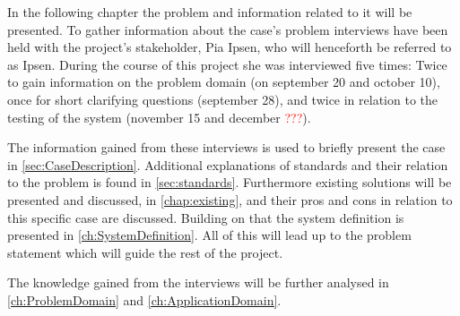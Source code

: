 In the following chapter the problem and information related to it will be presented.
To gather information about the case's problem interviews have been held with the project's stakeholder, Pia Ipsen, who will henceforth be referred to as Ipsen. 
During the course of this project she was interviewed five times: 
Twice to gain information on the problem domain (on september 20 and october 10),
once for short clarifying questions (september 28),
and twice in relation to the testing of the system (november 15 and december \textcolor{red}{???}).

The information gained from these interviews is used to briefly present the case in \cref{sec:CaseDescription}. 
Additional explanations of standards and their relation to the problem is found in \cref{sec:standards}.
Furthermore existing solutions will be presented and discussed, in \cref{chap:existing}, and their pros and cons in relation to this specific case are discussed.
Building on that the system definition is presented in \cref{ch:SystemDefinition}.
All of this will lead up to the problem statement which will guide the rest of the project.

The knowledge gained from the interviews will be further analysed in \cref{ch:ProblemDomain} and \cref{ch:ApplicationDomain}.